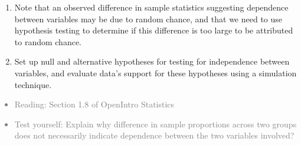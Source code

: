 \documentclass[11pt]{article}
\newcommand{\gray}[1]{\textcolor{gray}{#1}}
\begin{document}
%

\vspace{0.5cm}

%

\begin{enumerate}[resume]
\renewcommand\labelenumi{\textcolor{light}{\textbf{LO \theenumi.}}}
\item Note that an observed difference in sample statistics suggesting dependence between variables may be due to random chance, and that we need to use hypothesis testing to determine if this difference is too large to be attributed to random chance.
\item Set up null and alternative hypotheses for testing for independence between variables, and evaluate data's support for these hypotheses using a simulation technique.
\end{enumerate}

\gray{
{\it
\vspace{-0.75cm}
\begin{itemize}
\renewcommand{\labelitemi}{{\textcolor{dark}{$\ast$}}}
\item Reading: Section 1.8 of OpenIntro Statistics
\item Test yourself: Explain why difference in sample proportions across two groups does not necessarily indicate dependence between the two variables involved?
\end{itemize}
}}
\end{document}
